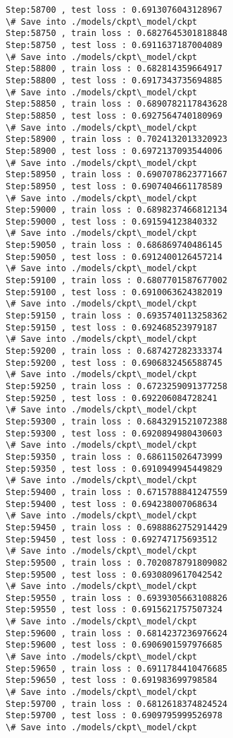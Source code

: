 \documentclass[11pt]{article}
\begin{document}
\begin{Verbatim}[commandchars=\\\{\}]
Step:58700 , test loss : 0.6913076043128967
\# Save into ./models/ckpt\_model/ckpt
Step:58750 , train loss : 0.6827645301818848
Step:58750 , test loss : 0.6911637187004089
\# Save into ./models/ckpt\_model/ckpt
Step:58800 , train loss : 0.682814359664917
Step:58800 , test loss : 0.6917343735694885
\# Save into ./models/ckpt\_model/ckpt
Step:58850 , train loss : 0.6890782117843628
Step:58850 , test loss : 0.6927564740180969
\# Save into ./models/ckpt\_model/ckpt
Step:58900 , train loss : 0.7024132013320923
Step:58900 , test loss : 0.6972137093544006
\# Save into ./models/ckpt\_model/ckpt
Step:58950 , train loss : 0.6907078623771667
Step:58950 , test loss : 0.6907404661178589
\# Save into ./models/ckpt\_model/ckpt
Step:59000 , train loss : 0.6898237466812134
Step:59000 , test loss : 0.691594123840332
\# Save into ./models/ckpt\_model/ckpt
Step:59050 , train loss : 0.686869740486145
Step:59050 , test loss : 0.6912400126457214
\# Save into ./models/ckpt\_model/ckpt
Step:59100 , train loss : 0.6807701587677002
Step:59100 , test loss : 0.6910063624382019
\# Save into ./models/ckpt\_model/ckpt
Step:59150 , train loss : 0.6935740113258362
Step:59150 , test loss : 0.692468523979187
\# Save into ./models/ckpt\_model/ckpt
Step:59200 , train loss : 0.687427282333374
Step:59200 , test loss : 0.6906832456588745
\# Save into ./models/ckpt\_model/ckpt
Step:59250 , train loss : 0.6723259091377258
Step:59250 , test loss : 0.692206084728241
\# Save into ./models/ckpt\_model/ckpt
Step:59300 , train loss : 0.6843291521072388
Step:59300 , test loss : 0.6920894980430603
\# Save into ./models/ckpt\_model/ckpt
Step:59350 , train loss : 0.686115026473999
Step:59350 , test loss : 0.6910949945449829
\# Save into ./models/ckpt\_model/ckpt
Step:59400 , train loss : 0.6715788841247559
Step:59400 , test loss : 0.694238007068634
\# Save into ./models/ckpt\_model/ckpt
Step:59450 , train loss : 0.6988862752914429
Step:59450 , test loss : 0.692747175693512
\# Save into ./models/ckpt\_model/ckpt
Step:59500 , train loss : 0.7020878791809082
Step:59500 , test loss : 0.6930809617042542
\# Save into ./models/ckpt\_model/ckpt
Step:59550 , train loss : 0.6939305663108826
Step:59550 , test loss : 0.6915621757507324
\# Save into ./models/ckpt\_model/ckpt
Step:59600 , train loss : 0.6814237236976624
Step:59600 , test loss : 0.6906901597976685
\# Save into ./models/ckpt\_model/ckpt
Step:59650 , train loss : 0.6911784410476685
Step:59650 , test loss : 0.691983699798584
\# Save into ./models/ckpt\_model/ckpt
Step:59700 , train loss : 0.6812618374824524
Step:59700 , test loss : 0.6909795999526978
\# Save into ./models/ckpt\_model/ckpt

\end{Verbatim}
\end{document}

